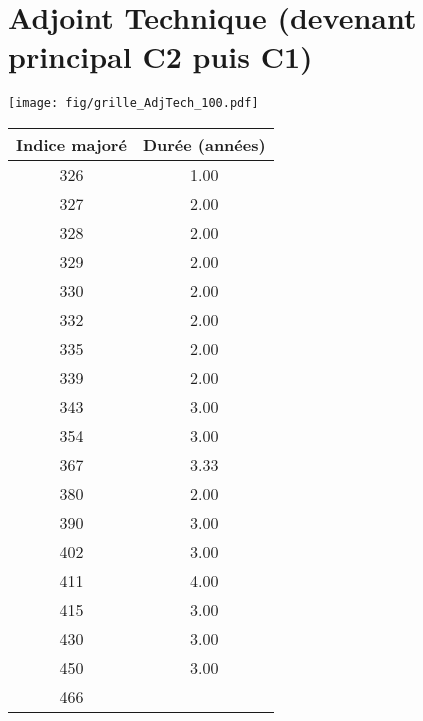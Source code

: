 \newpage 
 
\chapter{Adjoint Technique (devenant principal C2 puis C1)} 

\begin{minipage}{0.55\linewidth}\texttt{[image: fig/grille\_AdjTech\_100.pdf]}\end{minipage} 
\begin{minipage}{0.3\linewidth} 
 \begin{center} 

\begin{tabular}[htb]{|c|c|} 
\hline 
 Indice majoré &  Durée (années) \\ 
\hline \hline 
 326 &  1.00 \\ 
\hline 
 327 &  2.00 \\ 
\hline 
 328 &  2.00 \\ 
\hline 
 329 &  2.00 \\ 
\hline 
 330 &  2.00 \\ 
\hline 
 332 &  2.00 \\ 
\hline 
 335 &  2.00 \\ 
\hline 
 339 &  2.00 \\ 
\hline 
 343 &  3.00 \\ 
\hline 
 354 &  3.00 \\ 
\hline 
 367 &  3.33 \\ 
\hline 
 380 &  2.00 \\ 
\hline 
 390 &  3.00 \\ 
\hline 
 402 &  3.00 \\ 
\hline 
 411 &  4.00 \\ 
\hline 
 415 &  3.00 \\ 
\hline 
 430 &  3.00 \\ 
\hline 
 450 &  3.00 \\ 
\hline 
 466 &   \\ 
\hline 
\hline 
\end{tabular} 
\end{center} 
 \end{minipage} 

~\\ 
 


   
 \localtableofcontents 

